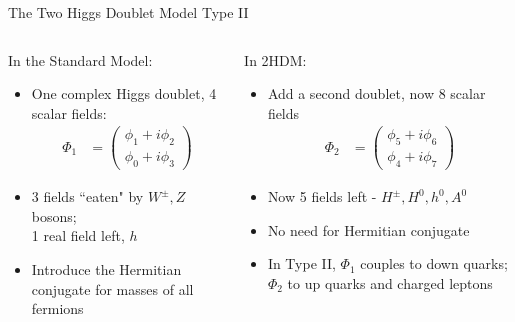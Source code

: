 \documentclass[10pt,xcolor={table,dvipsnames},t]{beamer}
\begin{document}
\begin{frame}{The Two Higgs Doublet Model Type II}
    \begin{columns}[t]
        \begin{column}{0.5\textwidth}
            In the Standard Model:
            \begin{itemize}
                \item One complex Higgs doublet, 4 scalar fields:
                    \begin{align}
                        \Phi_1 &= \begin{pmatrix} \phi_1 + i\phi_2 \\ \phi_0+i\phi_3\end{pmatrix}
                    \end{align}
                \item 3 fields ``eaten" by $W^\pm,Z$ bosons;\\ 1 real field left, $h$
                \item Introduce the Hermitian conjugate for masses of all fermions
            \end{itemize}
        \end{column}
        \begin{column}{0.5\textwidth}
            In 2HDM:
            \begin{itemize}
                \item Add a second doublet, now 8 scalar fields
                    \begin{align}
                        \Phi_2 &= \begin{pmatrix} \phi_5 + i\phi_6 \\ \phi_4 + i \phi_7\end{pmatrix}
                    \end{align}
                \item Now 5 fields left - $H^\pm,H^0,h^0,A^0$
                \item No need for Hermitian conjugate
                \item In Type II, $\Phi_1$ couples to down quarks; $\Phi_2$ to up quarks and charged leptons
            \end{itemize}
        \end{column}
    \end{columns}
\end{frame}
\end{document}
